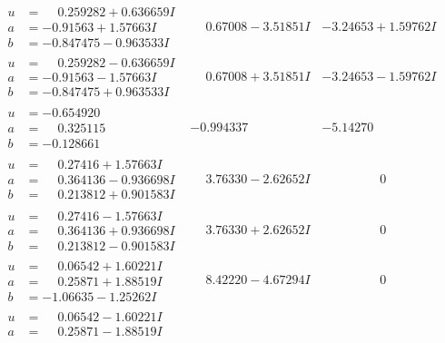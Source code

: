 \documentclass[1p]{elsarticle_modified}
\theoremstyle{definition}
\begin{document}
$$\begin{array}{c|c|c}
\begin{aligned}
u &= \phantom{-}0.259282 + 0.636659 I \\
a &= -0.91563 + 1.57663 I \\
b &= -0.847475 - 0.963533 I\end{aligned}
 & \phantom{-}0.67008 - 3.51851 I & -3.24653 + 1.59762 I \\ \hline\begin{aligned}
u &= \phantom{-}0.259282 - 0.636659 I \\
a &= -0.91563 - 1.57663 I \\
b &= -0.847475 + 0.963533 I\end{aligned}
 & \phantom{-}0.67008 + 3.51851 I & -3.24653 - 1.59762 I \\ \hline\begin{aligned}
u &= -0.654920\phantom{ +0.000000I} \\
a &= \phantom{-}0.325115\phantom{ +0.000000I} \\
b &= -0.128661\phantom{ +0.000000I}\end{aligned}
 & -0.994337\phantom{ +0.000000I} & -5.14270\phantom{ +0.000000I} \\ \hline\begin{aligned}
u &= \phantom{-}0.27416 + 1.57663 I \\
a &= \phantom{-}0.364136 - 0.936698 I \\
b &= \phantom{-}0.213812 + 0.901583 I\end{aligned}
 & \phantom{-}3.76330 - 2.62652 I & \phantom{-0.000000 } 0 \\ \hline\begin{aligned}
u &= \phantom{-}0.27416 - 1.57663 I \\
a &= \phantom{-}0.364136 + 0.936698 I \\
b &= \phantom{-}0.213812 - 0.901583 I\end{aligned}
 & \phantom{-}3.76330 + 2.62652 I & \phantom{-0.000000 } 0 \\ \hline\begin{aligned}
u &= \phantom{-}0.06542 + 1.60221 I \\
a &= \phantom{-}0.25871 + 1.88519 I \\
b &= -1.06635 - 1.25262 I\end{aligned}
 & \phantom{-}8.42220 - 4.67294 I & \phantom{-0.000000 } 0 \\ \hline\begin{aligned}
u &= \phantom{-}0.06542 - 1.60221 I \\
a &= \phantom{-}0.25871 - 1.88519 I \\

\end{aligned}
\end{array}$$
\end{document}
